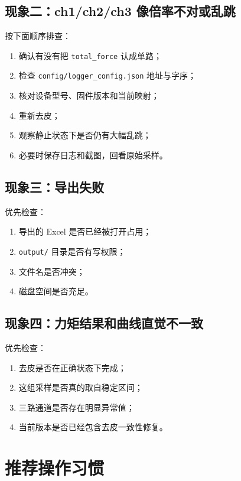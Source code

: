 \documentclass[11pt,a4paper]{ctexart}
\begin{document}
\subsection{现象二：ch1/ch2/ch3 像倍率不对或乱跳}

按下面顺序排查：

\begin{enumerate}[leftmargin=2em]
  \item 确认有没有把 \texttt{total\_force} 认成单路；
  \item 检查 \texttt{config/logger\_config.json} 地址与字序；
  \item 核对设备型号、固件版本和当前映射；
  \item 重新去皮；
  \item 观察静止状态下是否仍有大幅乱跳；
  \item 必要时保存日志和截图，回看原始采样。
\end{enumerate}

\subsection{现象三：导出失败}

优先检查：
\begin{enumerate}[leftmargin=2em]
  \item 导出的 Excel 是否已经被打开占用；
  \item \texttt{output/} 目录是否有写权限；
  \item 文件名是否冲突；
  \item 磁盘空间是否充足。
\end{enumerate}

\subsection{现象四：力矩结果和曲线直觉不一致}

优先检查：
\begin{enumerate}[leftmargin=2em]
  \item 去皮是否在正确状态下完成；
  \item 这组采样是否真的取自稳定区间；
  \item 三路通道是否存在明显异常值；
  \item 当前版本是否已经包含去皮一致性修复。
\end{enumerate}

\section{推荐操作习惯}
\end{document}
